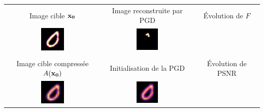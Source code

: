 \begin{tabular}{c c c}

Image cible $\bf{x_0}$  &  Image reconstruite par PGD  &  Évolution de $F$

\\

\includegraphics[width=0.25\textwidth]{resultats (legacy)/PGD/seed21-target-pas=1e-10_filtre=g-0.6.png}
&
\includegraphics[width=0.25\textwidth]{resultats (legacy)/PGD/seed21-guess-pas=1e-10_filtre=g-0.6.png}&


\\ \\

Image cible compressée $A(\bf{x_0})$  &  Initialisation de la PGD  & Évolution de PSNR

\\

\includegraphics[width=0.25\textwidth]{resultats (legacy)/PGD/seed21-comptarg-pas=1e-10_filtre=g-0.6.png}
&
\includegraphics[width=0.25\textwidth]{resultats (legacy)/PGD/seed21-init-pas=1e-10_filtre=g-0.6.png}
&


\end{tabular}